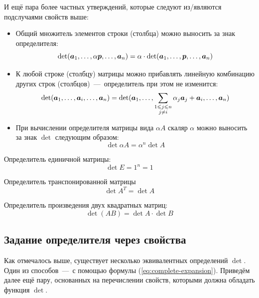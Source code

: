 \documentclass[a4paper,12pt]{article}
\begin{document}
  И ещё пара более частных утверждений, которые следуют из/являются подслучаями свойств выше:
  \begin{itemize}
    \item Общий множитель элементов строки (столбца) можно выносить за знак определителя:
      \[
        \det (\boldsymbol a_1, \ldots, \alpha \boldsymbol p, \ldots, \boldsymbol a_n)
          = \alpha \cdot \det (\boldsymbol a_1, \ldots, \boldsymbol p, \ldots, \boldsymbol a_n)
      \]
    \item К любой строке (столбцу) матрицы можно прибавлять линейную комбинацию других строк (столбцов)~---~определитель при этом не изменится:
      \[
        \det (\boldsymbol a_1, \ldots, \boldsymbol a_i, \ldots, \boldsymbol a_n)
          = \det (\boldsymbol a_1, \ldots, \sum_{\substack{1 \leqslant j \leqslant n\\j \not= i}} \alpha_j \boldsymbol a_j + \boldsymbol a_i, \ldots, \boldsymbol a_n)
      \]
    \item При вычислении определителя матрицы вида $\alpha A$ скаляр $\alpha$ можно выносить за знак $\det$ следующим образом:
      \[
        \det \alpha A = \alpha^n \det A
      \]
  \end{itemize}
  
  \begin{example}
    Определитель единичной матрицы:
    \[
      \det E = 1^n = 1
    \]
  \end{example}
  
  \begin{theorem}
    Определитель транспонированной матрицы
    \[
      \det A^T = \det A
    \]
  \end{theorem}
  
  \begin{theorem}
    Определитель произведения двух квадратных матриц:
    \[
      \det (AB) = \det A \cdot \det B
    \]
  \end{theorem}
  
  

  \subsection{Задание определителя через свойства}
  
  Как отмечалось выше, существует несколько эквивалентных определений $\det$.
  Один из способов~---~с помощью формулы (\ref{eq:complete-expansion}).
  Приведём далее ещё пару, основанных на перечислении свойств, которыми должна обладать функция $\det$.
  
\end{document}
